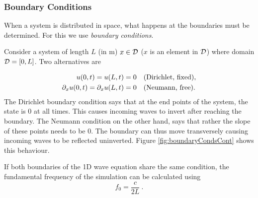 \subsubsection{Boundary Conditions}
When a system is distributed in space, what happens at the boundaries must be determined. For this we use \textit{boundary conditions}.


Consider a system of length $L$ (in m) $x\in \mathcal{D}$ ($x$ is an element in $\mathcal{D}$) where domain $\mathcal{D} = [0, L]$. Two alternatives are

\begin{subequations}\label{eq:boundaryCond1DWave}
    \begin{align}
        u(0, t) = u(L, t) &= 0\quad \text{(Dirichlet, fixed)},\label{eq:contDirichlet}\\
        \partial_x u(0, t) = \partial_x u(L, t) &= 0\quad \text{(Neumann, free)}.\label{eq:contNeumann}
    \end{align}
\end{subequations}
The Dirichlet boundary condition says that at the end points of the system, the state is 0 at all times. This causes incoming waves to invert after reaching the boundary. The Neumann condition on the other hand, says that rather the slope of these points needs to be 0. The boundary can thus move transversely causing incoming waves to be reflected uninverted. Figure \ref{fig:boundaryCondsCont} shows this behaviour.

If both boundaries of the 1D wave equation share the same condition, the fundamental frequency of the simulation can be calculated using 
\begin{equation}
    f_0 = \frac{c}{2L}\ .
\end{equation}

